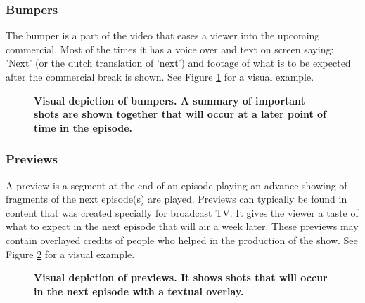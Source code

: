 \documentclass{report}
\begin{document}
\subsubsection{Bumpers}
The bumper is a part of the video that eases a viewer into the upcoming commercial. Most of the times it has a voice over and text on screen saying: 'Next' (or the dutch translation of 'next') and footage of what is to be expected after the commercial break is shown. See Figure \ref{fig:contextbumpers} for a visual example.

\begin{figure}[H]
	\caption{\textbf{Visual depiction of bumpers. A summary of important shots are shown together that will occur at a later point of time in the episode.}}
	\label{fig:contextbumpers}
\end{figure}

\subsubsection{Previews}
A preview is a segment at the end of an episode playing an advance showing of fragments of the next episode(s) are played. Previews can typically be found in content that was created specially for broadcast TV. It gives the viewer a taste of what to expect in the next episode that will air a week later. These previews may contain overlayed credits of people who helped in the production of the show. See Figure \ref{fig:contextpreviews} for a visual example.

\begin{figure}[H]
	\caption{\textbf{Visual depiction of previews. It shows shots that will occur in the next episode with a textual overlay.}}
	\label{fig:contextpreviews}
\end{figure}
\end{document}

